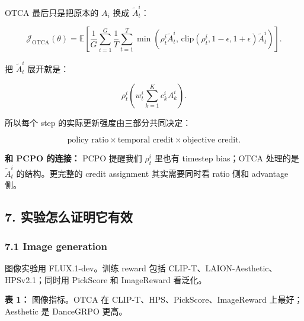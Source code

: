 OTCA 最后只是把原本的 \(A_i\) 换成 \(\tilde{A}_t^i\)：

\[
\mathcal{J}_{\mathrm{OTCA}}(\theta)
=
\mathbb{E}
\left[
\frac{1}{G}\sum_{i=1}^{G}
\frac{1}{T}\sum_{t=1}^{T}
\min
\left(
\rho_t^i \tilde{A}_t^i,\,
\mathrm{clip}(\rho_t^i,1-\epsilon,1+\epsilon)\tilde{A}_t^i
\right)
\right].
\]

把 \(\tilde{A}_t^i\) 展开就是：

\[
\rho_t^i
\left(
w_t^i
\sum_{k=1}^{K}c_k^i A_k^i
\right).
\]

所以每个 step 的实际更新强度由三部分共同决定：

\[
\text{policy ratio}
\times
\text{temporal credit}
\times
\text{objective credit}.
\]

\begin{summarybox}
\textbf{和 PCPO 的连接：} PCPO 提醒我们 \(\rho_t^i\) 里也有 timestep bias；OTCA 处理的是 \(\tilde{A}_t^i\) 的结构。更完整的 credit assignment 其实需要同时看 ratio 侧和 advantage 侧。
\end{summarybox}

\subsection{7. 实验怎么证明它有效}

\subsubsection{7.1 Image generation}

图像实验用 FLUX.1-dev。训练 reward 包括 CLIP-T、LAION-Aesthetic、HPSv2.1；同时用 PickScore 和 ImageReward 看泛化。

\begin{center}

{\small \textbf{表 1：} 图像指标。OTCA 在 CLIP-T、HPS、PickScore、ImageReward 上最好；Aesthetic 是 DanceGRPO 更高。}
\end{center}

